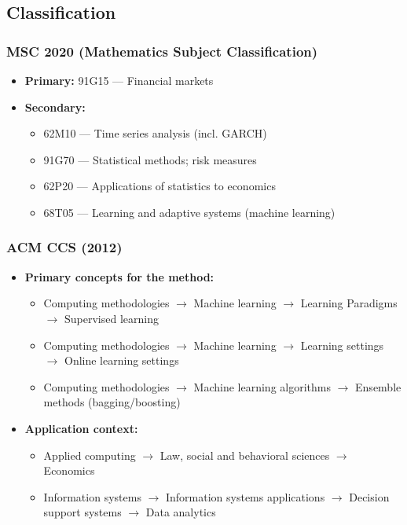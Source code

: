 \documentclass[12pt,a4paper]{article}
\begin{document}
\subsection{Classification}

\subsubsection{MSC 2020 (Mathematics Subject Classification)}
\begin{itemize}
    \item \textbf{Primary:} 91G15 — Financial markets
    \item \textbf{Secondary:}
    \begin{itemize}
        \item 62M10 — Time series analysis (incl. GARCH)
        \item 91G70 — Statistical methods; risk measures
        \item 62P20 — Applications of statistics to economics
        \item 68T05 — Learning and adaptive systems (machine learning)
    \end{itemize}
\end{itemize}

\subsubsection{ACM CCS (2012)}
\begin{itemize}
    \item \textbf{Primary concepts for the method:}
    \begin{itemize}
        \item Computing methodologies $\rightarrow$ Machine learning $\rightarrow$ Learning Paradigms $\rightarrow$ Supervised learning
        \item Computing methodologies $\rightarrow$ Machine learning $\rightarrow$ Learning settings $\rightarrow$ Online learning settings
        \item Computing methodologies $\rightarrow$ Machine learning algorithms $\rightarrow$ Ensemble methods (bagging/boosting)
    \end{itemize}
    \item \textbf{Application context:}
    \begin{itemize}
        \item Applied computing $\rightarrow$ Law, social and behavioral sciences $\rightarrow$ Economics
        \item Information systems $\rightarrow$ Information systems applications $\rightarrow$ Decision support systems $\rightarrow$ Data analytics
    \end{itemize}
\end{itemize}
\end{document}
